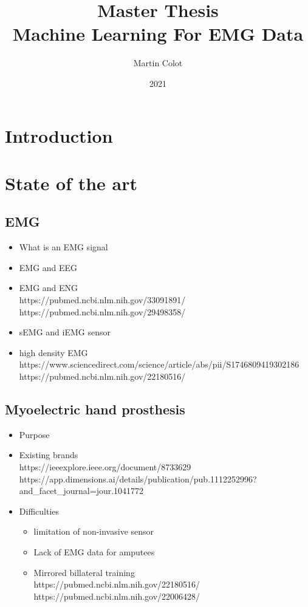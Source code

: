 \documentclass{article}
\title{Master Thesis\\Machine Learning For EMG Data}
\author{Martin Colot}
\date{2021}
\begin{document}
\maketitle


\section{Introduction}


\section{State of the art}

\subsection{EMG}

\begin{itemize}
    \item What is an EMG signal
    \item EMG and EEG
    \item EMG and ENG \\
    https://pubmed.ncbi.nlm.nih.gov/33091891/  \\
    https://pubmed.ncbi.nlm.nih.gov/29498358/
    \item sEMG and iEMG sensor
    \item high density EMG \\
    https://www.sciencedirect.com/science/article/abs/pii/S1746809419302186 \\
    https://pubmed.ncbi.nlm.nih.gov/22180516/
\end{itemize}


\subsection{Myoelectric hand prosthesis}

\begin{itemize}
    \item Purpose
    \item Existing brands \\
    https://ieeexplore.ieee.org/document/8733629 \\
    https://app.dimensions.ai/details/publication/pub.1112252996?and\_facet\_journal=jour.1041772
    \item Difficulties
    \begin{itemize}
        \item limitation of non-invasive sensor
        \item Lack of EMG data for amputees
        \item Mirrored billateral training \\
        https://pubmed.ncbi.nlm.nih.gov/22180516/ \\
        https://pubmed.ncbi.nlm.nih.gov/22006428/
    \end{itemize}
\end{itemize}
\end{document}

